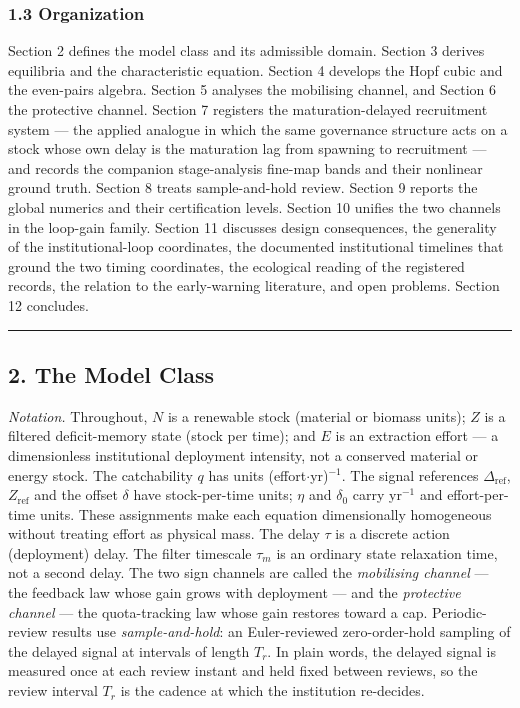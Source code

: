 \documentclass[11pt]{article}
\begin{document}
\subsubsection{1.3 Organization}\label{organization}

Section 2 defines the model class and its admissible domain. Section 3
derives equilibria and the characteristic equation. Section 4 develops
the Hopf cubic and the even-pairs algebra. Section 5 analyses the
mobilising channel, and Section 6 the protective channel. Section 7
registers the maturation-delayed recruitment system --- the applied
analogue in which the same governance structure acts on a stock whose
own delay is the maturation lag from spawning to recruitment --- and
records the companion stage-analysis fine-map bands and their nonlinear
ground truth. Section 8 treats sample-and-hold review. Section 9 reports
the global numerics and their certification levels. Section 10 unifies
the two channels in the loop-gain family. Section 11 discusses design
consequences, the generality of the institutional-loop coordinates, the
documented institutional timelines that ground the two timing
coordinates, the ecological reading of the registered records, the
relation to the early-warning literature, and open problems. Section 12
concludes.

\begin{center}\rule{0.5\linewidth}{0.5pt}\end{center}

\subsection{2. The Model Class}\label{the-model-class}

\emph{Notation.} Throughout, \(N\) is a renewable stock (material or
biomass units); \(Z\) is a filtered deficit-memory state (stock per
time); and \(E\) is an extraction effort --- a dimensionless
institutional deployment intensity, not a conserved material or energy
stock. The catchability \(q\) has units (effort\ensuremath{\cdot}yr)\(^{-1}\). The signal
references \(\Delta_{\mathrm{ref}}\), \(Z_{\mathrm{ref}}\) and the
offset \(\delta\) have stock-per-time units; \(\eta\) and \(\delta_0\)
carry yr\(^{-1}\) and effort-per-time units. These assignments make each
equation dimensionally homogeneous without treating effort as physical
mass. The delay \(\tau\) is a discrete action (deployment) delay. The
filter timescale \(\tau_m\) is an ordinary state relaxation time, not a
second delay. The two sign channels are called the \emph{mobilising
channel} --- the feedback law whose gain grows with deployment --- and
the \emph{protective channel} --- the quota-tracking law whose gain
restores toward a cap. Periodic-review results use
\emph{sample-and-hold}: an Euler-reviewed zero-order-hold sampling of
the delayed signal at intervals of length \(T_r\). In plain words, the
delayed signal is measured once at each review instant and held fixed
between reviews, so the review interval \(T_r\) is the cadence at which
the institution re-decides.
\end{document}
